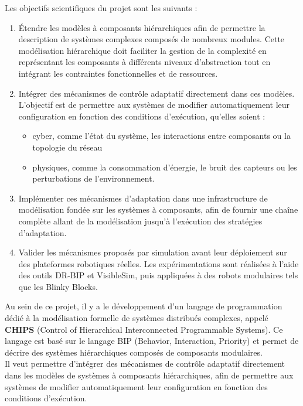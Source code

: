 Les objectifs scientifiques du projet sont les suivants :
\begin{enumerate}
    \item Étendre les modèles à composants hiérarchiques afin de permettre la description de systèmes complexes 
    composés de nombreux modules. Cette modélisation hiérarchique doit faciliter la gestion de la complexité en 
    représentant les composants à différents niveaux d'abstraction tout en intégrant les contraintes 
    fonctionnelles et de ressources.
    \item Intégrer des mécanismes de contrôle adaptatif directement dans ces modèles. L'objectif est de permettre 
    aux systèmes de modifier automatiquement leur configuration en fonction des conditions d'exécution, qu'elles 
    soient :
    \begin{itemize}
        \item cyber, comme l'état du système, les interactions entre composants ou la topologie du réseau 
        \item physiques, comme la consommation d'énergie, le bruit des capteurs ou les perturbations de l'environnement.
    \end{itemize}
    \item Implémenter ces mécanismes d'adaptation dans une infrastructure de modélisation fondée sur les systèmes 
    à composants, afin de fournir une chaîne complète allant de la modélisation jusqu'à l'exécution des stratégies 
    d'adaptation.
    \item Valider les mécanismes proposés par simulation avant leur déploiement sur des plateformes robotiques 
    réelles. Les expérimentations sont réalisées à l'aide des outils DR-BIP et VisibleSim, puis appliquées à des 
    robots modulaires tels que les Blinky Blocks.
\end{enumerate}

Au sein de ce projet, il y a le développement d'un langage de programmation dédié à la modélisation formelle de systèmes distribués complexes, appelé \textbf{CHIPS} (Control of Hierarchical Interconnected Programmable Systems). Ce langage est basé sur le langage BIP (Behavior, Interaction, Priority) et permet de décrire des systèmes hiérarchiques composés de composants modulaires. \\

Il veut permettre d'intégrer des mécanismes de contrôle adaptatif directement dans les modèles de systèmes à composants hiérarchiques, afin de permettre aux systèmes de modifier automatiquement leur configuration en fonction des conditions d'exécution. \\

\FloatBarrier

\newpage
